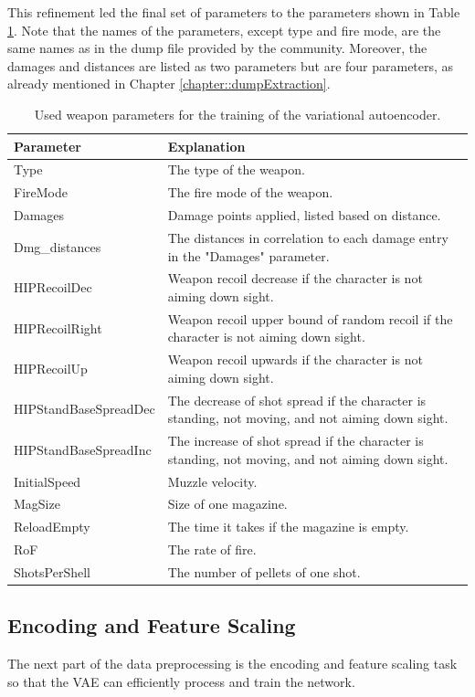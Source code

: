 \documentclass[MGS,Master,english]{twbook}%
\begin{document}
This refinement led the final set of parameters to the parameters shown in Table \ref{table::bf1::usedParams}. Note that the names of the parameters, except type and fire mode, are the same names as in the dump file provided by the  community. Moreover, the damages and distances are listed as two parameters but are four parameters, as already mentioned in Chapter \ref{chapter::dumpExtraction}.
\begin{table}[!ht]
	\centering
	\begin{tabular}{|l|p{10.8cm}|}
		\hline
		\textbf{Parameter} & \textbf{Explanation} \\ \hline
		Type & The type of the weapon. \\ \hline
		FireMode & The fire mode of the weapon. \\ \hline
		Damages & Damage points applied, listed based on distance. \\ \hline
		Dmg\_distances & The distances in correlation to each damage entry in the "Damages" parameter. \\ \hline
		HIPRecoilDec & Weapon recoil decrease if the character is not aiming down sight. \\ \hline
		HIPRecoilRight & Weapon recoil upper bound of random recoil if the character is not aiming down sight. \\ \hline
		HIPRecoilUp & Weapon recoil upwards if the character is not aiming down sight. \\ \hline
		HIPStandBaseSpreadDec & The decrease of shot spread if the character is standing, not moving, and not aiming down sight. \\ \hline
		HIPStandBaseSpreadInc & The increase of shot spread if the character is standing, not moving, and not aiming down sight. \\ \hline
		InitialSpeed & Muzzle velocity. \\ \hline
		MagSize & Size of one magazine. \\ \hline
		ReloadEmpty & The time it takes if the magazine is empty. \\ \hline
		RoF & The rate of fire. \\ \hline
		ShotsPerShell & The number of pellets of one shot. \\ \hline
	\end{tabular}
	\caption{Used weapon parameters for the training of the variational autoencoder.}
	\label{table::bf1::usedParams}
\end{table}

\subsection{Encoding and Feature Scaling}
The next part of the data preprocessing is the encoding and feature scaling task so that the VAE can efficiently process and train the network. 
\end{document}
